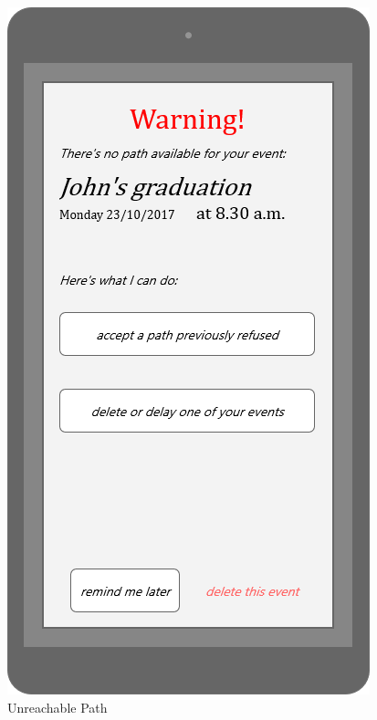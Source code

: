 \documentclass{article}
\begin{document}
\begin{figure}[H]
  \includegraphics[width=\linewidth]{06-Path_not_available.png}
  \caption{Unreachable Path}\label{fig:MU9}
\endminipage
\end{figure}
\end{document}

